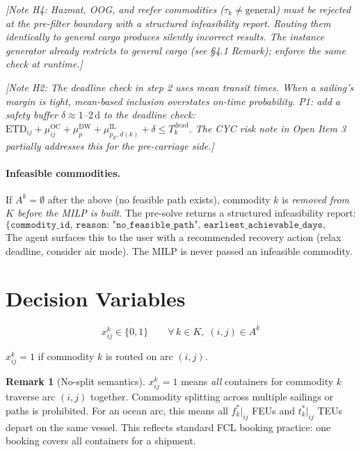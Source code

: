\documentclass[11pt,a4paper]{article}
\theoremstyle{definition}
\newtheorem{remark}{Remark}
\begin{document}
\textit{[Note H4: Hazmat, OOG, and reefer commodities ($\tau_k \neq \text{general}$) must be
rejected at the pre-filter boundary with a structured infeasibility report. Routing them
identically to general cargo produces silently incorrect results. The instance generator
already restricts to general cargo (see §4.1 Remark); enforce the same check at runtime.]}

\textit{[Note H2: The deadline check in step 2 uses mean transit times. When a sailing's margin
is tight, mean-based inclusion overstates on-time probability. P1: add a safety buffer
$\delta \approx 1$--$2\,\text{d}$ to the deadline check:
$\text{ETD}_{ij} + \mu_{ij}^{\text{OC}} + \mu_p^{\text{DW}} + \mu_{p_E,d(k)}^{\text{IL}} + \delta \leq T_k^{\text{dead}}$.
The CYC risk note in Open Item 3 partially addresses this for the pre-carriage side.]}

\paragraph{Infeasible commodities.}
If $A^k = \emptyset$ after the above (no feasible path exists), commodity $k$ is \emph{removed
from $K$ before the MILP is built}. The pre-solve returns a structured infeasibility report:
\[
  \texttt{\{commodity\_id, reason: "no\_feasible\_path",
  earliest\_achievable\_days, deadline\_shortfall\_days\}}
\]
The agent surfaces this to the user with a recommended recovery action (relax deadline,
consider air mode). The MILP is never passed an infeasible commodity.

\section{Decision Variables}

\[
  x_{ij}^k \in \{0, 1\} \qquad \forall\, k \in K,\; (i,j) \in A^k
\]

$x_{ij}^k = 1$ if commodity $k$ is routed on arc $(i,j)$.

\begin{remark}[No-split semantics]
$x_{ij}^k = 1$ means \emph{all} containers for commodity $k$ traverse arc $(i,j)$ together.
Commodity splitting across multiple sailings or paths is prohibited. For an ocean arc, this
means all $f_k^*\big|_{ij}$ FEUs and $t_k^*\big|_{ij}$ TEUs depart on the same vessel.
This reflects standard FCL booking practice: one booking covers all containers for a shipment.
\end{remark}
\end{document}
